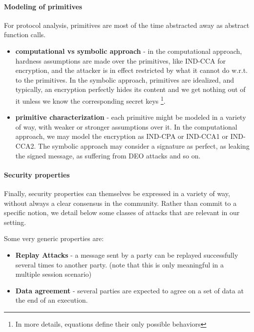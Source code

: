 \documentclass{article}
\begin{document}
 \paragraph{Modeling of  primitives} For protocol analysis, primitives are most of the time abstracted away as abstract function calls. 

 \begin{itemize}
 \item \textbf{computational vs symbolic approach} - in the computational approach, hardness assumptions are made over the primitives, like IND-CCA for encryption, and the attacker is in effect restricted by what it cannot do w.r.t. to the primitives. In the symbolic approach, primitives are idealized, and typically, an encryption perfectly hides its content and we get nothing out of it unless we know the corresponding secret keys \footnote{In more details, equations define their only possible behaviors}.
\item \textbf{primitive characterization} - each primitive might be modeled in a variety of way, with weaker or stronger assumptions over it. In the computational approach, we may model the encryption as IND-CPA or IND-CCA1 or IND-CCA2. The symbolic approach may consider a signature as perfect, as leaking the signed message, as suffering from  DEO attacks and so on.    
\end{itemize}

\paragraph{Security properties}

Finally, security properties can themselves be expressed in a variety of way, without always a clear consensus in the community. Rather than commit to a specific notion, we detail below some classes of attacks that are relevant in our setting.

Some very generic properties are:
\begin{itemize}
\item \textbf{Replay Attacks} - a message sent by a party can be replayed successfully several times to another party. (note that this is only meaningful in a multiple session scenario)
\item \textbf{Data agreement} - several parties are expected to agree on a set of data at the end of an execution.
\end{itemize}
\end{document}

